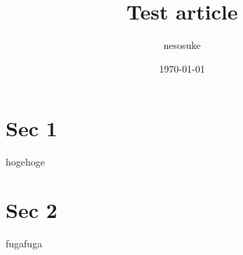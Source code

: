 \documentclass{ltjsarticle}
\author{nesosuke}
\title{Test article}
\date{\today}
\begin{document}
\maketitle

\section{Sec 1}
hogehoge

\section{Sec 2}
fugafuga
\end{document}
